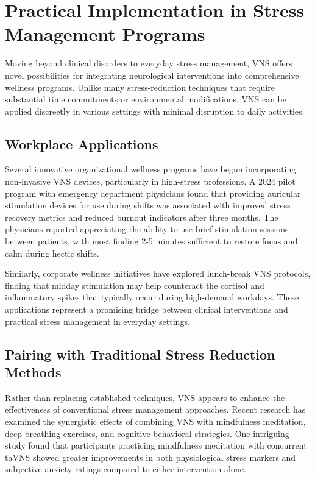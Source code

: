 \documentclass[
  Letterpaper,
]{scrbook}
\begin{document}
\section{Practical Implementation in Stress Management
Programs}\label{practical-implementation-in-stress-management-programs}

Moving beyond clinical disorders to everyday stress management, VNS
offers novel possibilities for integrating neurological interventions
into comprehensive wellness programs. Unlike many stress-reduction
techniques that require substantial time commitments or environmental
modifications, VNS can be applied discreetly in various settings with
minimal disruption to daily activities.

\subsection{Workplace Applications}\label{workplace-applications}

Several innovative organizational wellness programs have begun
incorporating non-invasive VNS devices, particularly in high-stress
professions. A 2024 pilot program with emergency department physicians
found that providing auricular stimulation devices for use during shifts
was associated with improved stress recovery metrics and reduced burnout
indicators after three months. The physicians reported appreciating the
ability to use brief stimulation sessions between patients, with most
finding 2-5 minutes sufficient to restore focus and calm during hectic
shifts.

Similarly, corporate wellness initiatives have explored lunch-break VNS
protocols, finding that midday stimulation may help counteract the
cortisol and inflammatory spikes that typically occur during high-demand
workdays. These applications represent a promising bridge between
clinical interventions and practical stress management in everyday
settings.

\subsection{Pairing with Traditional Stress Reduction
Methods}\label{pairing-with-traditional-stress-reduction-methods}

Rather than replacing established techniques, VNS appears to enhance the
effectiveness of conventional stress management approaches. Recent
research has examined the synergistic effects of combining VNS with
mindfulness meditation, deep breathing exercises, and cognitive
behavioral strategies. One intriguing study found that participants
practicing mindfulness meditation with concurrent taVNS showed greater
improvements in both physiological stress markers and subjective anxiety
ratings compared to either intervention alone.
\end{document}

